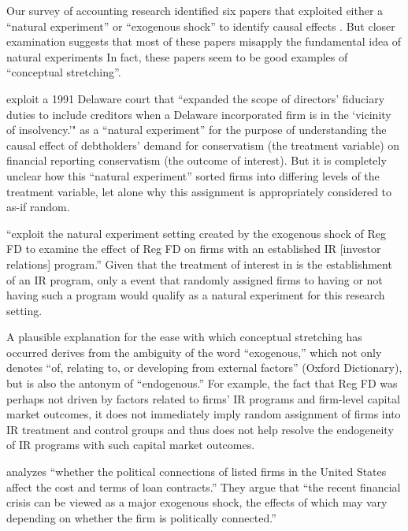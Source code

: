 \documentclass[11pt]{amsart}
\begin{document}
Our survey of accounting research identified six papers that exploited either a ``natural experiment'' or ``exogenous shock'' to identify causal effects \citep{Lo:2013jk,Aier:2014ii,Kirk:2014gx,Houston:2014hv}. %
But closer examination suggests that most of these papers misapply the fundamental idea of natural experiments  In fact, these papers seem to be good examples of ``conceptual stretching''.

\cite{Aier:2014ii} exploit a 1991 Delaware court that ``expanded the scope of directors' fiduciary duties to include creditors when a Delaware incorporated firm is in the `vicinity of insolvency.'" as a ``natural experiment'' for the purpose of understanding the causal effect of debtholders' demand for conservatism (the treatment variable) on financial reporting conservatism (the outcome of interest). But it is completely unclear how this ``natural experiment'' sorted firms into differing levels of the treatment variable, let alone why this assignment is appropriately considered to as-if random.

\citet{Kirk:2014gx} ``exploit the natural experiment setting created by the exogenous shock of Reg FD to examine the effect of Reg FD on firms with an established IR [investor relations] program.'' 
Given that the treatment of interest in \citet{Kirk:2014gx} is the establishment of an IR program, only a event that randomly assigned firms to having or not having such a program would qualify as a natural experiment for this research setting.

A plausible explanation for the ease with which conceptual stretching has occurred derives from the ambiguity of the word ``exogenous,'' which not only denotes  ``of, relating to, or developing from external factors'' (Oxford Dictionary), but is also the antonym of ``endogenous.''
For example, the fact that Reg FD was perhaps not driven by factors related to firms' IR programs and firm-level capital market outcomes, it does not immediately imply random assignment of firms into IR treatment and control groups and thus does not help resolve the endogeneity of IR programs with such capital market outcomes.

\cite{Houston:2014hv} analyzes ``whether the political connections of listed firms in the United States affect the cost and terms of loan contracts.'' They argue that ``the recent financial crisis can be viewed as a major exogenous shock, the effects of which may vary depending on whether the firm is politically connected.'' 
\end{document}
